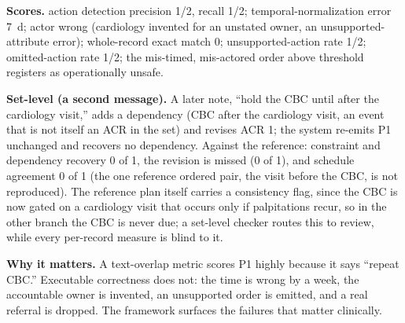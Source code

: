 \documentclass[3p,twocolumn]{elsarticle}
\begin{document}
\textbf{Scores.} action detection precision 1/2, recall 1/2; temporal-normalization error 7~d; actor wrong (cardiology invented for an unstated owner, an unsupported-attribute error); whole-record exact match 0; unsupported-action rate 1/2; omitted-action rate 1/2; the mis-timed, mis-actored order above threshold registers as operationally unsafe.

\textbf{Set-level (a second message).} A later note, ``hold the CBC until after the cardiology visit,'' adds a dependency (CBC after the cardiology visit, an event that is not itself an ACR in the set) and revises ACR 1; the system re-emits P1 unchanged and recovers no dependency. Against the reference: constraint and dependency recovery 0 of 1, the revision is missed (0 of 1), and schedule agreement 0 of 1 (the one reference ordered pair, the visit before the CBC, is not reproduced). The reference plan itself carries a consistency flag, since the CBC is now gated on a cardiology visit that occurs only if palpitations recur, so in the other branch the CBC is never due; a set-level checker routes this to review, while every per-record measure is blind to it.

\textbf{Why it matters.} A text-overlap metric scores P1 highly because it says ``repeat CBC.'' Executable correctness does not: the time is wrong by a week, the accountable owner is invented, an unsupported order is emitted, and a real referral is dropped. The framework surfaces the failures that matter clinically.
\end{document}
